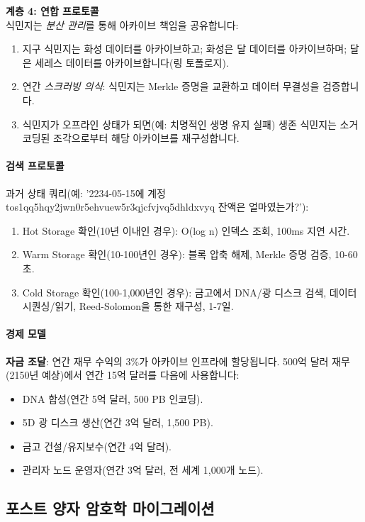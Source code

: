 \documentclass[11pt]{article}
\begin{document}
\textbf{계층 4: 연합 프로토콜}\\
식민지는 \emph{분산 관리}를 통해 아카이브 책임을 공유합니다:
\begin{enumerate}[noitemsep]
  \item 지구 식민지는 화성 데이터를 아카이브하고; 화성은 달 데이터를 아카이브하며; 달은 세레스 데이터를 아카이브합니다(링 토폴로지).
  \item 연간 \emph{스크러빙 의식}: 식민지는 Merkle 증명을 교환하고 데이터 무결성을 검증합니다.
  \item 식민지가 오프라인 상태가 되면(예: 치명적인 생명 유지 실패) 생존 식민지는 소거 코딩된 조각으로부터 해당 아카이브를 재구성합니다.
\end{enumerate}

\paragraph{검색 프로토콜}
과거 상태 쿼리(예: '2234-05-15에 계정 tos1qq5hqy2jwn0r5ehvuew5r3qjcfvjvq5dhldxvyq 잔액은 얼마였는가?'):
\begin{enumerate}[noitemsep]
  \item Hot Storage 확인(10년 이내인 경우): O(log n) 인덱스 조회, 100ms 지연 시간.
  \item Warm Storage 확인(10-100년인 경우): 블록 압축 해제, Merkle 증명 검증, 10-60초.
  \item Cold Storage 확인(100-1,000년인 경우): 금고에서 DNA/광 디스크 검색, 데이터 시퀀싱/읽기, Reed-Solomon을 통한 재구성, 1-7일.
\end{enumerate}

\paragraph{경제 모델}
\textbf{자금 조달}: 연간 재무 수익의 3\%가 아카이브 인프라에 할당됩니다. 500억 달러 재무(2150년 예상)에서 연간 15억 달러를 다음에 사용합니다:
\begin{itemize}[noitemsep]
  \item DNA 합성(연간 5억 달러, 500 PB 인코딩).
  \item 5D 광 디스크 생산(연간 3억 달러, 1,500 PB).
  \item 금고 건설/유지보수(연간 4억 달러).
  \item 관리자 노드 운영자(연간 3억 달러, 전 세계 1,000개 노드).
\end{itemize}

\subsection{포스트 양자 암호학 마이그레이션}
\end{document}
